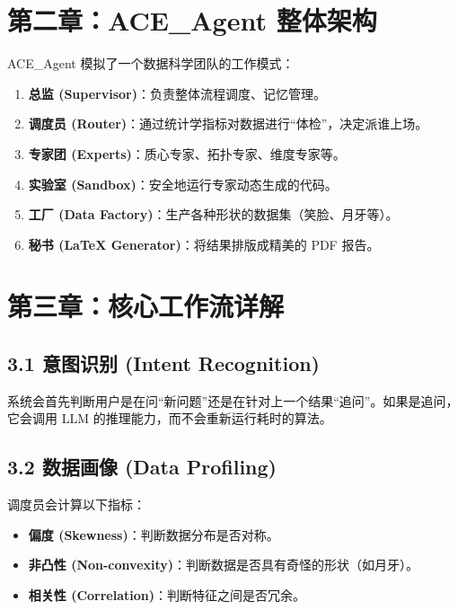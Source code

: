\documentclass[11pt,a4paper]{article}
\begin{document}
\section{第二章：ACE\_Agent 整体架构}

ACE\_Agent 模拟了一个数据科学团队的工作模式：

\begin{tcolorbox}[title=团队角色分配]
\begin{enumerate}
    \item \textbf{总监 (Supervisor)}：负责整体流程调度、记忆管理。
    \item \textbf{调度员 (Router)}：通过统计学指标对数据进行“体检”，决定派谁上场。
    \item \textbf{专家团 (Experts)}：质心专家、拓扑专家、维度专家等。
    \item \textbf{实验室 (Sandbox)}：安全地运行专家动态生成的代码。
    \item \textbf{工厂 (Data Factory)}：生产各种形状的数据集（笑脸、月牙等）。
    \item \textbf{秘书 (LaTeX Generator)}：将结果排版成精美的 PDF 报告。
\end{enumerate}
\end{tcolorbox}

\section{第三章：核心工作流详解}

\subsection{3.1 意图识别 (Intent Recognition)}
系统会首先判断用户是在问“新问题”还是在针对上一个结果“追问”。如果是追问，它会调用 LLM 的推理能力，而不会重新运行耗时的算法。

\subsection{3.2 数据画像 (Data Profiling)}
调度员会计算以下指标：
\begin{itemize}
    \item \textbf{偏度 (Skewness)}：判断数据分布是否对称。
    \item \textbf{非凸性 (Non-convexity)}：判断数据是否具有奇怪的形状（如月牙）。
    \item \textbf{相关性 (Correlation)}：判断特征之间是否冗余。
\end{itemize}
\end{document}

